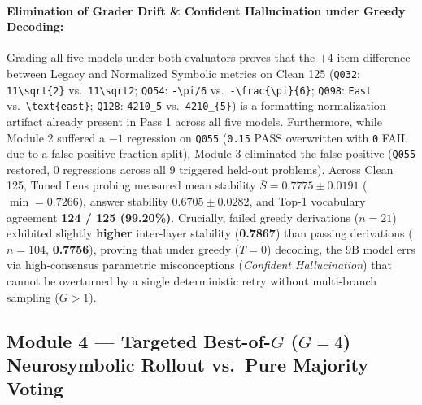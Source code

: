 \documentclass[11pt,a4paper]{article}
\begin{document}
\paragraph{Elimination of Grader Drift \& Confident Hallucination under Greedy Decoding:}
Grading all five models under both evaluators proves that the $+4$ item difference between Legacy and Normalized Symbolic metrics on Clean 125 (\texttt{Q032}: \texttt{11\textbackslash sqrt\{2\}} vs.\ \texttt{11\textbackslash sqrt2}; \texttt{Q054}: \texttt{-\textbackslash pi/6} vs.\ \texttt{-\textbackslash frac\{\textbackslash pi\}\{6\}}; \texttt{Q098}: \texttt{East} vs.\ \texttt{\textbackslash text\{east\}}; \texttt{Q128}: \texttt{4210\_5} vs.\ \texttt{4210\_\{5\}}) is a formatting normalization artifact already present in Pass 1 across all five models. Furthermore, while Module 2 suffered a $-1$ regression on \texttt{Q055} (\texttt{0.15} PASS overwritten with \texttt{0} FAIL due to a false-positive fraction split), Module 3 eliminated the false positive (\texttt{Q055} restored, 0 regressions across all 9 triggered held-out problems). Across Clean 125, Tuned Lens probing measured mean stability $\bar{S} = 0.7775 \pm 0.0191$ ($\min = 0.7266$), answer stability $0.6705 \pm 0.0282$, and Top-1 vocabulary agreement \textbf{124 / 125 (99.20\%)}. Crucially, failed greedy derivations ($n=21$) exhibited slightly \textbf{higher} inter-layer stability (\textbf{0.7867}) than passing derivations ($n=104$, \textbf{0.7756}), proving that under greedy ($T=0$) decoding, the 9B model errs via high-consensus parametric misconceptions (\textit{Confident Hallucination}) that cannot be overturned by a single deterministic retry without multi-branch sampling ($G > 1$).

\subsection{Module 4 --- Targeted Best-of-$G$ ($G=4$) Neurosymbolic Rollout vs.\ Pure Majority Voting}
\end{document}
